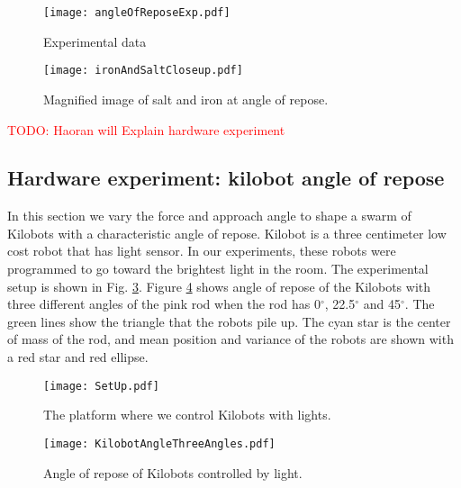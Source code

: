 \begin{figure}
\begin{center}
	\texttt{[image: angleOfReposeExp.pdf]}
\end{center}
\caption{\label{fig:angleOfReposeExp}
Experimental data
}
\end{figure}

\begin{figure}
\begin{center}
	\texttt{[image: ironAndSaltCloseup.pdf]}
\end{center}
\caption{\label{fig:ironAndSaltCloseup}
Magnified image of salt and iron at angle of repose.
}
\end{figure}

\textcolor{red}{TODO: Haoran will Explain hardware experiment}

\subsection{Hardware experiment: kilobot angle of repose}

In this section we vary the force and approach angle to shape a swarm of Kilobots \cite{rubenstein2014programmable} with a characteristic angle of repose. Kilobot is a three centimeter low cost robot that has light sensor. In our experiments, these robots were programmed to go toward the brightest light in the room. The experimental setup is shown in Fig. \ref{fig:SetUp}. Figure \ref{fig:kilobotAngle} shows angle of repose of the Kilobots with three different angles of the pink rod when the rod has 0$^\circ$, 22.5$^\circ$ and 45$^\circ$. The green lines show the triangle that the robots pile up. The cyan star is the center of mass of the rod, and mean position and variance of the robots are shown with a red star and red ellipse.
\begin{figure}
\begin{center}
	\texttt{[image: SetUp.pdf]}
\end{center}
\caption{\label{fig:SetUp}
The platform where we control Kilobots with lights.
}
\end{figure}


\begin{figure}
\begin{center}
	\texttt{[image: KilobotAngleThreeAngles.pdf]}
\end{center}
\caption{\label{fig:kilobotAngle}
Angle of repose of Kilobots controlled by light.
}
\end{figure}




